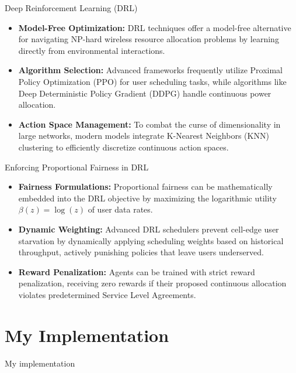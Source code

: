 \documentclass[aspectratio=169]{beamer}
\begin{document}
\begin{frame}{Deep Reinforcement Learning (DRL)}
    \begin{itemize}
        \item \textbf{Model-Free Optimization:} DRL techniques offer a model-free alternative for navigating NP-hard wireless resource allocation problems by learning directly from environmental interactions.
        \item \textbf{Algorithm Selection:} Advanced frameworks frequently utilize Proximal Policy Optimization (PPO) for user scheduling tasks, while algorithms like Deep Deterministic Policy Gradient (DDPG) handle continuous power allocation.
        \item \textbf{Action Space Management:} To combat the curse of dimensionality in large networks, modern models integrate K-Nearest Neighbors (KNN) clustering to efficiently discretize continuous action spaces.
    \end{itemize}
\end{frame}

\begin{frame}{Enforcing Proportional Fairness in DRL}
    \begin{itemize}
        \item \textbf{Fairness Formulations:} Proportional fairness can be mathematically embedded into the DRL objective by maximizing the logarithmic utility $\beta(z) = \log(z)$ of user data rates.
        \item \textbf{Dynamic Weighting:} Advanced DRL schedulers prevent cell-edge user starvation by dynamically applying scheduling weights based on historical throughput, actively punishing policies that leave users underserved.
        \item \textbf{Reward Penalization:} Agents can be trained with strict reward penalization, receiving zero rewards if their proposed continuous allocation violates predetermined Service Level Agreements.
    \end{itemize}
\end{frame}

\section{My Implementation}
\begin{frame}
    \huge
    \centering
    My implementation
\end{frame}
\end{document}
